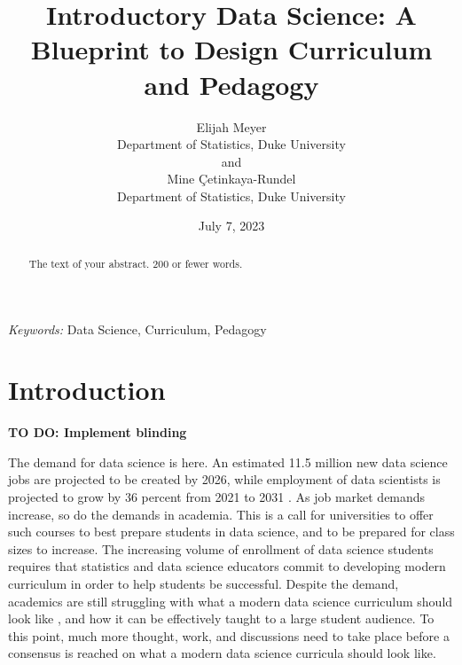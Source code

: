 \documentclass[
  12pt]{article}
\begin{document}
\def\spacingset#1{\renewcommand{\baselinestretch}%
{#1}\small\normalsize} \spacingset{1}



\date{July 7, 2023}
\title{\bf Introductory Data Science: A Blueprint to Design Curriculum
and Pedagogy}
\author{
Elijah Meyer\\
Department of Statistics, Duke University\\
and\\Mine Çetinkaya-Rundel\\
Department of Statistics, Duke University\\
}
\maketitle

\bigskip
\bigskip
\begin{abstract}
The text of your abstract. 200 or fewer words.
\end{abstract}

\noindent%
{\it Keywords:} Data Science, Curriculum, Pedagogy
\vfill

\newpage
\spacingset{1.9} %
\ifdefined\Shaded\renewenvironment{Shaded}{\begin{tcolorbox}[interior hidden, boxrule=0pt, borderline west={3pt}{0pt}{shadecolor}, sharp corners, breakable, enhanced, frame hidden]}{\end{tcolorbox}}\fi

\hypertarget{introduction}{%
\section{Introduction}\label{introduction}}

\textbf{TO DO: Implement blinding}

The demand for data science is here. An estimated 11.5 million new data
science jobs are projected to be created by 2026, while employment of
data scientists is projected to grow by 36 percent from 2021 to 2031
\citep{labor_2022}. As job market demands increase, so do the demands in
academia. This is a call for universities to offer such courses to best
prepare students in data science, and to be prepared for class sizes to
increase. The increasing volume of enrollment of data science students
\citep{Redmond2022} requires that statistics and data science educators
commit to developing modern curriculum in order to help students be
successful. Despite the demand, academics are still struggling with what
a modern data science curriculum should look like \citep{Schwab2020},
and how it can be effectively taught to a large student audience. To
this point, much more thought, work, and discussions need to take place
before a consensus is reached on what a modern data science curricula
should look like.
\end{document}
